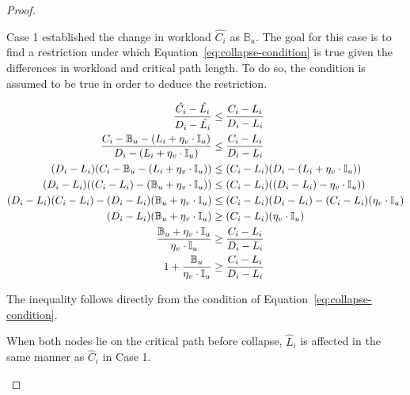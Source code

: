 \begin{theorem}
\begin{proof}
\begin{case}
      Case 1 established the change in workload
      ${\hat{C_i}}$ as ${\mathbb{B}_u}$. The goal for this
      case is to find a restriction under which
      Equation~\ref{eq:collapse-condition} is true given the
      differences in workload and critical path length. To do so, the
      condition is assumed to be true in order to deduce the restriction.

      \begin{align*}
        \indent
        \frac{\hat{C_i} - \hat{L_i}} 
             {D_i - \hat{L_i}} &\le
        \frac{C_i - L_i}
             {D_i - L_i} \\
        \frac{C_i - \mathbb{B}_u - (L_i + \eta_v
          \cdot \mathbb{I}_u)} 
             {D_i - (L_i + \eta_v
          \cdot \mathbb{I}_u)} &\le
        \frac{C_i - L_i}
             {D_i - L_i} \\
        (D_i - L_i)(C_i - \mathbb{B}_u - (L_i + \eta_v \cdot \mathbb{I}_u))
             &\le
             (C_i - L_i)(D_i - (L_i + \eta_v \cdot \mathbb{I}_u)) \\
        (D_i - L_i)((C_i - L_i) - (\mathbb{B}_u + \eta_v \cdot \mathbb{I}_u))
             &\le
             (C_i - L_i)((D_i - L_i) - \eta_v \cdot \mathbb{I}_u)) \\
        (D_i - L_i)(C_i - L_i) -
             (D_i - L_i)(\mathbb{B}_u + \eta_v \cdot \mathbb{I}_u)
             &\le
             (C_i - L_i)(D_i - L_i) - (C_i - L_i)(\eta_v \cdot \mathbb{I}_u) \\
        (D_i - L_i)(\mathbb{B}_u + \eta_v \cdot \mathbb{I}_u)
             &\ge
             (C_i - L_i)(\eta_v \cdot \mathbb{I}_u) \\
        \frac{\mathbb{B}_u + \eta_v \cdot \mathbb{I}_u}
             {\eta_v \cdot \mathbb{I}_u}
             &\ge
             \frac{C_i - L_i}{D_i - L_i} \\
        1 + \frac{\mathbb{B}_u}
             {\eta_v \cdot \mathbb{I}_u}
             &\ge
             \frac{C_i - L_i}{D_i - L_i}
      \end{align*}

      The inequality follows directly from the condition of
      Equation~\ref{eq:collapse-condition}.
    \end{case}

    \begin{case}
      When both nodes lie on the critical path before collapse,
      ${\hat{L}_i}$ is affected in the same manner as ${\hat{C}_i}$ in
      Case 1. 


\end{case}
\end{proof}
\end{theorem}
